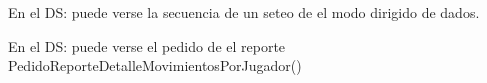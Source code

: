 
En el DS: puede verse la secuencia de un seteo de el modo dirigido de dados.


En el DS: puede verse el pedido de el reporte PedidoReporteDetalleMovimientosPorJugador()



